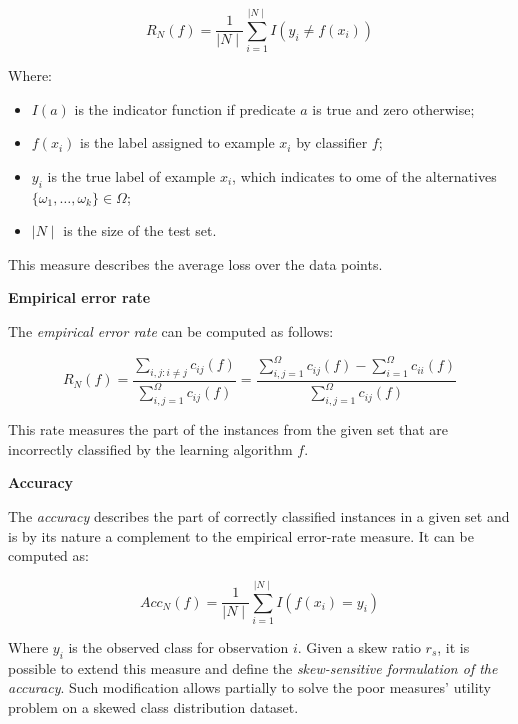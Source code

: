 \documentclass[11pt,]{article}
\providecommand{\tightlist}{%
  \setlength{\itemsep}{0pt}\setlength{\parskip}{0pt}}
\begin{document}
\begin{equation}
R_{N} (f) = \frac{1}{\mid N \mid} \sum_{i = 1}^{\mid N \mid} I (y_i \neq f (x_i))
\end{equation}

Where:

\begin{itemize}
\tightlist
\item
  \(I(a)\) is the indicator function if predicate \(a\) is true and zero
  otherwise;
\item
  \(f(x_i)\) is the label assigned to example \(x_i\) by classifier
  \(f\);
\item
  \(y_i\) is the true label of example \(x_i\), which indicates to ome
  of the alternatives \(\{\omega_1, \dots, \omega_k\} \in \Omega\);
\item
  \(\mid N \mid\) is the size of the test set.
\end{itemize}

This measure describes the average loss over the data points.

\textbf{Empirical error rate}

The \emph{empirical error rate} can be computed as follows:

\begin{equation}
R_N (f) = \frac
    {\sum_{i, j: i \neq j} c_{ij} (f)}
    {\sum_{i,j = 1}^{\Omega} c_{ij} (f)} =
  \frac
    {\sum_{i,j = 1}^{\Omega} c_{ij} (f) - \sum_{i = 1}^{\Omega} c_{ii} (f)}
    {\sum_{i,j = 1}^{\Omega} c_{ij} (f)}
\end{equation}

This rate measures the part of the instances from the given set that are
incorrectly classified by the learning algorithm \(f\).

\textbf{Accuracy}

The \emph{accuracy} describes the part of correctly classified instances
in a given set and is by its nature a complement to the empirical
error-rate measure. It can be computed as:

\begin{equation}
Acc_N (f) = \frac{1}{\mid N \mid} \sum_{i = 1}^{\mid N \mid} I (f (x_i) = y_i)
\end{equation}

Where \(y_i\) is the observed class for observation \(i\). Given a skew
ratio \(r_s\), it is possible to extend this measure and define the
\emph{skew-sensitive formulation of the accuracy}. Such modification
allows partially to solve the poor measures' utility problem on a skewed
class distribution dataset.
\end{document}
